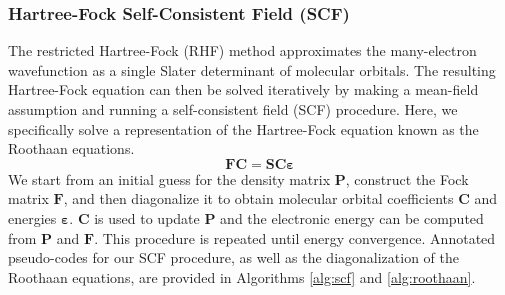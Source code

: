 \documentclass[12pt]{article}
\begin{document}
\subsubsection*{Hartree-Fock Self-Consistent Field (SCF)}

The restricted Hartree-Fock (RHF) method approximates the many-electron wavefunction as a single Slater determinant of molecular orbitals. The resulting Hartree-Fock equation can then be solved iteratively by making a mean-field assumption and running a self-consistent field (SCF) procedure. Here, we specifically solve a representation of the Hartree-Fock equation known as the Roothaan equations. 
\[
\mathbf{F} \mathbf{C} = \mathbf{S} \mathbf{C} \boldsymbol{\varepsilon}
\]
We start from an initial guess for the density matrix $\mathbf{P}$, construct the Fock matrix $\mathbf{F}$, and then diagonalize it to obtain molecular orbital coefficients $\mathbf{C}$ and energies $\boldsymbol{\varepsilon}$. $\mathbf{C}$ is used to update $\mathbf{P}$ and the electronic energy can be computed from $\mathbf{P}$ and $\mathbf{F}$. This procedure is repeated until energy convergence. Annotated pseudo-codes for our SCF procedure, as well as the diagonalization of the Roothaan equations, are provided in Algorithms \ref{alg:scf} and \ref{alg:roothaan}. 
\end{document}
